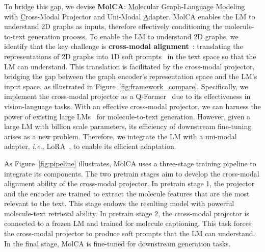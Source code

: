 \documentclass[11pt]{article}
\newcommand{\ie}{\emph{i.e., }}
\begin{document}
To bridge this gap, we devise \textbf{MolCA}: \underline{Mol}ecular Graph-Language Modeling with \underline{C}ross-Modal Projector and Uni-Modal \underline{A}dapter. MolCA enables the LM to understand 2D graphs as inputs, therefore effectively conditioning the molecule-to-text generation process. To enable the LM to understand 2D graphs, we identify that the key challenge is \textbf{cross-modal alignment}~\citep{BLIP2, LinearMapping, Flamingo}: translating the representations of 2D graphs into 1D soft prompts~\citep{PrefixTuning} in the text space so that the LM can understand. This translation is facilitated by the cross-modal projector, bridging the gap between the graph encoder's representation space and the LM's input space, as illustrated in Figure~\ref{fig:framework_compare}. Specifically, we implement the cross-modal projector as a Q-Former~\cite{BLIP2} due to its effectiveness in vision-language tasks. With an effective cross-modal projector, we can harness the power of existing large LMs~\cite{Galactica, LLama} for molecule-to-text generation. However, given a large LM with billion scale parameters, its efficiency of downstream fine-tuning arises as a new problem. Therefore, we integrate the LM with a uni-modal adapter, \ie LoRA~\cite{LoRA}, to enable its efficient adaptation. 













As Figure~\ref{fig:pipeline} illustrates, MolCA uses a three-stage training pipeline to integrate its components. The two pretrain stages aim to develop the cross-modal alignment ability of the cross-modal projector. In pretrain stage 1, the projector and the encoder are trained to extract the molecule features that are the most relevant to the text. This stage endows the resulting model with powerful molecule-text retrieval ability. In pretrain stage 2, the cross-modal projector is connected to a frozen LM and trained for molecule captioning. This task forces the cross-modal projector to produce soft prompts that the LM can understand. In the final stage, MolCA is fine-tuned for downstream generation tasks. 
\end{document}
